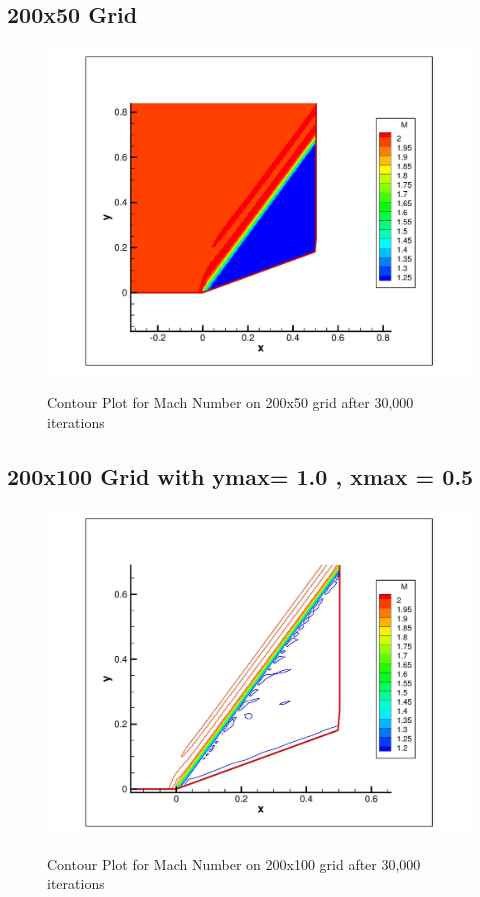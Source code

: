 \documentclass{article}
\begin{document}
\subsection*{200x50 Grid}
\begin{figure}[H]   \label{figure}
\includegraphics[width=14cm]{200x50/grid50.jpg}		%
\label{figure:}
\caption{Contour Plot for Mach Number on 200x50 grid after 30,000 iterations}
\end{figure}
\newpage

\subsection*{200x100 Grid with ymax= 1.0 , xmax = 0.5}
\begin{figure}[H]   \label{figure}
\includegraphics[width=15cm]{200x100/grid100.jpg}		%
\label{figure:}
\caption{Contour Plot for Mach Number on 200x100 grid after 30,000 iterations}
\end{figure}
\end{document}
